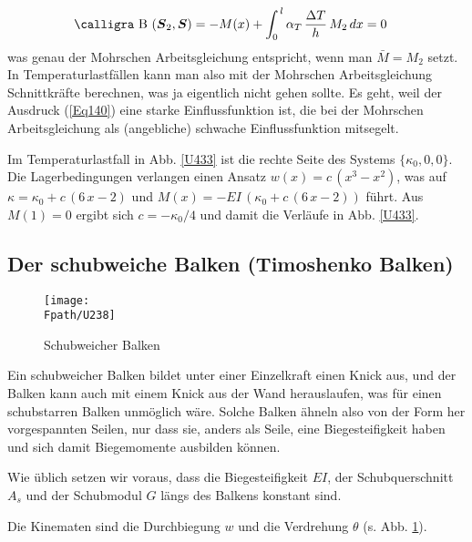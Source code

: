 \begin{align}\label{Eq140}
\text{\normalfont\calligra B\,\,}(\vek S_2, \vek S)
&= - M(x) + \int_0^{\,l} \alpha_T\,\frac{\Delta T}{h}\,M_2\,dx = 0
\end{align}
was genau der Mohrschen Arbeitsgleichung entspricht, wenn man $\bar{M} = M_2$ setzt. In Temperaturlastf\"{a}llen kann man also mit der Mohrschen Arbeitsgleichung Schnittkr\"{a}fte berechnen, was ja eigentlich nicht gehen sollte. Es geht, weil der Ausdruck (\ref{Eq140}) eine starke Einflussfunktion ist, die bei der Mohrschen Arbeitsgleichung als (angebliche) schwache Einflussfunktion \glq mitsegelt\grq{}.

Im Temperaturlastfall in Abb. \ref{U433} ist die rechte Seite des Systems $\{\kappa_0,0,0\}$. Die Lagerbedingungen verlangen einen Ansatz $w(x) = c\,(x^3 - x^2)$, was auf $\kappa = \kappa_0 + c\,(6\,x - 2)$ und $M(x) = - EI\,(\kappa_0 + c\,(6\,x - 2))$ f\"{u}hrt. Aus $M(1) = 0$ ergibt sich $c = - \kappa_0/4$ und damit die Verl\"{a}ufe in Abb. \ref{U433}.

\textcolor{sectionTitleBlue}{\section{Der schubweiche Balken (Timoshenko Balken)}}
\begin{figure}[tbp]
\centering
\if {} \sidecaption \fi
\texttt{[image: \\Fpath/U238]}
\caption{Schubweicher Balken} \label{WinkelAngle}
\end{figure}%

Ein schubweicher Balken bildet unter einer Einzelkraft einen Knick aus, und der Balken kann auch mit einem Knick aus der Wand herauslaufen, was f\"{u}r einen schubstarren Balken unm\"{o}glich w\"{a}re. Solche Balken \"{a}hneln also von der Form her vorgespannten Seilen, nur dass sie, anders als Seile, eine Biegesteifigkeit haben und sich damit Biegemomente ausbilden k\"{o}nnen.

Wie \"{u}blich setzen wir voraus, dass die Biegesteifigkeit $EI$, der Schubquerschnitt  $A_s$
und der Schubmodul $G$ l\"{a}ngs des Balkens konstant sind.

Die Kinematen sind die Durchbiegung $w$ und die Verdrehung $\theta$ (s. Abb. \ref{WinkelAngle}).

